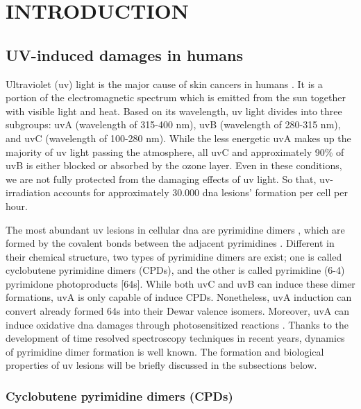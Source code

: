 \setlength{\parindent}{0pt}
\chapter{\bf INTRODUCTION}

\section{UV-induced damages in humans}

Ultraviolet (\gls{uv}) light is the major cause of skin cancers in humans \citep{kiefer2007effects}. It is a portion of the electromagnetic spectrum which is emitted from the sun together with visible light and heat. Based on its wavelength, \gls{uv} light divides into three subgroups: \gls{uv}A (wavelength of 315-400 nm), \gls{uv}B (wavelength of 280-315 nm), and \gls{uv}C (wavelength of 100-280 nm). While the less energetic \gls{uv}A makes up the majority of \gls{uv} light passing the atmosphere, all \gls{uv}C and approximately 90\% of \gls{uv}B is either blocked or absorbed by the ozone layer. Even in these conditions, we are not fully protected from the damaging effects of \gls{uv} light. So that, \gls{uv}-irradiation accounts for approximately 30.000 \gls{dna} lesions’ formation per cell per hour. 

The most abundant \gls{uv} lesions in cellular \gls{dna} are pyrimidine dimers \citep{kielbassa1997wavelength}, which are formed by the covalent bonds between the adjacent pyrimidines \citep{whitmore2001effect}. Different in their chemical structure, two types of pyrimidine dimers are exist; one is called cyclobutene pyrimidine dimers (\gls{CPD}s), and the other is called pyrimidine (6-4) pyrimidone photoproducts [\gls{64}s]. While both \gls{uv}C and \gls{uv}B can induce these dimer formations, \gls{uv}A is only capable of induce \gls{CPD}s. Nonetheless, \gls{uv}A induction can convert already formed \gls{64}s into their Dewar valence isomers. Moreover, \gls{uv}A can induce oxidative \gls{dna} damages through photosensitized reactions \citep{hu2017cartography}. Thanks to the development of time resolved spectroscopy techniques in recent years, dynamics of pyrimidine dimer formation is well known. The formation and biological properties of \gls{uv} lesions will be briefly discussed in the subsections below.   

\subsection{Cyclobutene pyrimidine dimers (CPDs)} 

